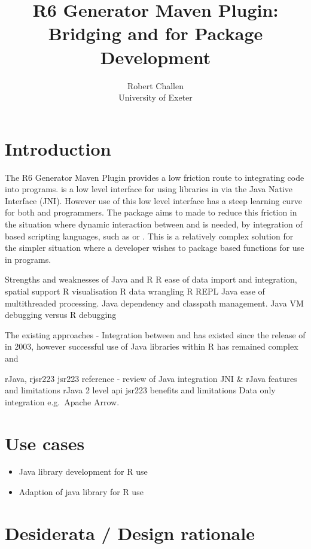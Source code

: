 \documentclass[
]{jss}
\author{
Robert Challen\\University of Exeter
}
\title{R6 Generator Maven Plugin: Bridging \proglang{Java} and \proglang{R6}
for Package Development}
\providecommand{\tightlist}{%
  \setlength{\itemsep}{0pt}\setlength{\parskip}{0pt}}
\begin{document}
\hypertarget{introduction}{%
\section{Introduction}\label{introduction}}

The R6 Generator Maven Plugin provides a low friction route to
integrating  code into  programs. 
is a low level interface for using  libraries in
 via the Java Native Interface (JNI). However use of this
low level interface has a steep learning curve for both  and
 programmers. The  package aims to made to
reduce this friction in the situation where dynamic interaction between
 and  is needed, by integration of
 based scripting languages, such as  or
. This is a relatively complex solution for the simpler
situation where a developer wishes to package  based
functions for use in  programs.

Strengths and weaknesses of Java and R R ease of data import and
integration, spatial support R visualisation R data wrangling R REPL
Java ease of multithreaded processing. Java dependency and classpath
management. Java VM debugging versus R debugging

The existing approaches - Integration between  and
 has existed since the release of  in 2003,
however successful use of Java libraries within R has remained complex
and

rJava, rjsr223 jsr223 reference - review of Java integration JNI \&
rJava features and limitations rJava 2 level api jsr223 benefits and
limitations Data only integration e.g.~Apache Arrow.

\hypertarget{use-cases}{%
\section{Use cases}\label{use-cases}}

\begin{itemize}
\tightlist
\item
  Java library development for R use
\item
  Adaption of java library for R use
\end{itemize}

\hypertarget{desiderata-design-rationale}{%
\section{Desiderata / Design
rationale}\label{desiderata-design-rationale}}
\end{document}
